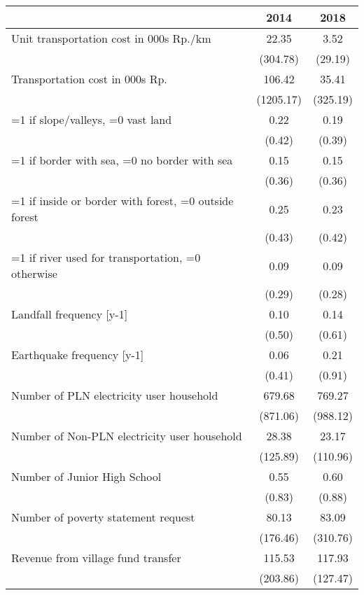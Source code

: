 \begin{tabular}{l*{2}{c}}
\hline\hline
                    &        2014&        2018\\
\hline
Unit transportation cost in 000s Rp./km&       22.35&        3.52\\
                    &    (304.78)&     (29.19)\\
Transportation cost in 000s Rp.&      106.42&       35.41\\
                    &   (1205.17)&    (325.19)\\
=1 if slope/valleys, =0 vast land&        0.22&        0.19\\
                    &      (0.42)&      (0.39)\\
=1 if border with sea, =0 no border with sea&        0.15&        0.15\\
                    &      (0.36)&      (0.36)\\
=1 if inside or border with forest, =0 outside forest&        0.25&        0.23\\
                    &      (0.43)&      (0.42)\\
=1 if river used for transportation, =0 otherwise&        0.09&        0.09\\
                    &      (0.29)&      (0.28)\\
Landfall frequency [y-1]&        0.10&        0.14\\
                    &      (0.50)&      (0.61)\\
Earthquake frequency [y-1]&        0.06&        0.21\\
                    &      (0.41)&      (0.91)\\
Number of PLN electricity user household&      679.68&      769.27\\
                    &    (871.06)&    (988.12)\\
Number of Non-PLN electricity user household&       28.38&       23.17\\
                    &    (125.89)&    (110.96)\\
Number of Junior High School&        0.55&        0.60\\
                    &      (0.83)&      (0.88)\\
Number of poverty statement request&       80.13&       83.09\\
                    &    (176.46)&    (310.76)\\
Revenue from village fund transfer&      115.53&      117.93\\
                    &    (203.86)&    (127.47)\\
\hline\hline
\end{tabular}
